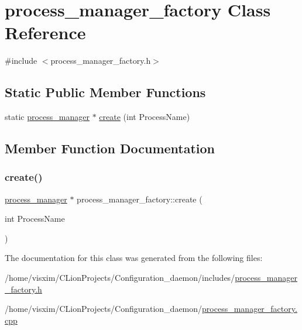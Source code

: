 \hypertarget{classprocess__manager__factory}{}\section{process\+\_\+manager\+\_\+factory Class Reference}
\label{classprocess__manager__factory}


{\ttfamily \#include $<$process\+\_\+manager\+\_\+factory.\+h$>$}

\subsection*{Static Public Member Functions}
\begin{DoxyCompactItemize}
\item 
static \hyperlink{classprocess__manager}{process\+\_\+manager} $\ast$ \hyperlink{classprocess__manager__factory_a07decfe26b5180955201ba54243d70e5}{create} (int Process\+Name)
\end{DoxyCompactItemize}


\subsection{Member Function Documentation}
\mbox{\label{classprocess__manager__factory_a07decfe26b5180955201ba54243d70e5}} 
\subsubsection{\texorpdfstring{create()}{create()}}
{\footnotesize\ttfamily \hyperlink{classprocess__manager}{process\+\_\+manager} $\ast$ process\+\_\+manager\+\_\+factory\+::create (\begin{DoxyParamCaption}\item[{int}]{Process\+Name }\end{DoxyParamCaption})\hspace{0.3cm}{\ttfamily [static]}}



The documentation for this class was generated from the following files\+:\begin{DoxyCompactItemize}
\item 
/home/visxim/\+C\+Lion\+Projects/\+Configuration\+\_\+daemon/includes/\hyperlink{process__manager__factory_8h}{process\+\_\+manager\+\_\+factory.\+h}\item 
/home/visxim/\+C\+Lion\+Projects/\+Configuration\+\_\+daemon/\hyperlink{process__manager__factory_8cpp}{process\+\_\+manager\+\_\+factory.\+cpp}\end{DoxyCompactItemize}
